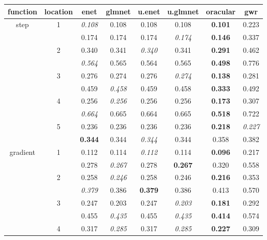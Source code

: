 \documentclass[authoryear, review, 11pt]{elsarticle}
\begin{document}
\begin{table}
\thispagestyle{empty}
\begin{center}
\begin{tabular}{cccccccc}
 function & location & enet & glmnet & u.enet & u.glmnet & oracular & gwr \\ 
  \hline
  \multirow{10}{*}{step} & \multirow{2}{*}{1} & \emph{0.108} & 0.108 & 0.108 & 0.108 & \textbf{0.101} & 0.223 \\ 
   &  & 0.174 & 0.174 & 0.174 & \emph{0.174} & \textbf{0.146} & 0.337 \\ 
   \cline{3-8}
   & \multirow{2}{*}{2} & 0.340 & 0.341 & \emph{0.340} & 0.341 & \textbf{0.291} & 0.462 \\ 
   &  & \emph{0.564} & 0.565 & 0.564 & 0.565 & \textbf{0.498} & 0.776 \\ 
   \cline{3-8}
   & \multirow{2}{*}{3} & 0.276 & 0.274 & 0.276 & \emph{0.274} & \textbf{0.138} & 0.281 \\ 
   &  & 0.459 & \emph{0.458} & 0.459 & 0.458 & \textbf{0.333} & 0.492 \\ 
   \cline{3-8}
   & \multirow{2}{*}{4} & 0.256 & \emph{0.256} & 0.256 & 0.256 & \textbf{0.173} & 0.307 \\ 
   &  & \emph{0.664} & 0.665 & 0.664 & 0.665 & \textbf{0.518} & 0.722 \\ 
   \cline{3-8}
   & \multirow{2}{*}{5} & 0.236 & 0.236 & 0.236 & 0.236 & \textbf{0.218} & \emph{0.227} \\ 
   &  & \textbf{0.344} & 0.344 & \emph{0.344} & 0.344 & 0.358 & 0.382 \\ 
   \hline
  \multirow{10}{*}{gradient} & \multirow{2}{*}{1} & 0.112 & 0.114 & \emph{0.112} & 0.114 & \textbf{0.096} & 0.217 \\ 
   &  & 0.278 & \emph{0.267} & 0.278 & \textbf{0.267} & 0.320 & 0.558 \\ 
   \cline{3-8}
   & \multirow{2}{*}{2} & 0.258 & \emph{0.246} & 0.258 & 0.246 & \textbf{0.216} & 0.353 \\ 
   &  & \emph{0.379} & 0.386 & \textbf{0.379} & 0.386 & 0.413 & 0.570 \\ 
   \cline{3-8}
   & \multirow{2}{*}{3} & 0.247 & 0.203 & 0.247 & \emph{0.203} & \textbf{0.181} & 0.292 \\ 
   &  & 0.455 & \emph{0.435} & 0.455 & \emph{0.435} & \textbf{0.414} & 0.574 \\ 
   \cline{3-8}
   & \multirow{2}{*}{4} & 0.317 & \emph{0.285} & 0.317 & \emph{0.285} & \textbf{0.227} & 0.309 \\ 

\end{tabular}
\end{center}
\end{table}
\end{document}
